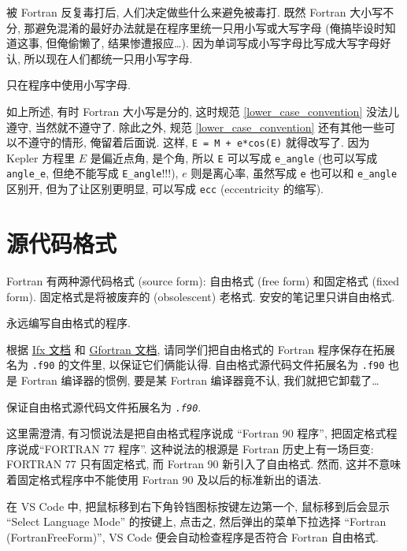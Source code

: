 被 Fortran 反复毒打后, 人们决定做些什么来避免被毒打. 既然 Fortran 大小写不分, 那避免混淆的最好办法就是在程序里统一只用小写或大写字母 (俺搞毕设时知道这事, 但俺偷懒了, 结果惨遭报应\dots{}). 因为单词写成小写字母比写成大写字母好认, 所以现在人们都统一只用小写字母.
\begin{convention}
    只在程序中使用小写字母.\label{lower_case_convention}
\end{convention}
如上所述, 有时 Fortran 大小写是分的, 这时规范 \ref{lower_case_convention} 没法儿遵守, 当然就不遵守了. 除此之外, 规范 \ref{lower_case_convention} 还有其他一些可以不遵守的情形, 俺留着后面说. 这样, \texttt{E = M + e*cos(E)} 就得改写了. 因为 Kepler 方程里 $E$ 是偏近点角, 是个角, 所以 \texttt{E} 可以写成 \texttt{e\_{}angle} (也可以写成 \texttt{angle\_{}e}, 但绝不能写成 \texttt{E\_{}angle}!!!), $e$ 则是离心率, 虽然写成 \texttt{e} 也可以和 \texttt{e\_{}angle} 区别开, 但为了让区别更明显, 可以写成 \texttt{ecc} (eccentricity 的缩写).

\section{源代码格式}

Fortran 有两种源代码格式 (source form): 自由格式 (free form) 和固定格式 (fixed form). 固定格式是将被废弃的 (obsolescent) 老格式. 安安的笔记里只讲自由格式.
\begin{convention}
    永远编写自由格式的程序.
\end{convention}

根据 \href{https://cdrdv2.intel.com/v1/dl/getContent/824360?fileName=fortran-compiler_developer-guide-reference_2024.2-767251-824360.pdf}{Ifx 文档} 和 \href{https://gcc.gnu.org/onlinedocs/gcc-13.2.0/gfortran.pdf}{Gfortran 文档}, 请同学们把自由格式的 Fortran 程序保存在拓展名为 \texttt{.f90} 的文件里, 以保证它们俩能认得. 自由格式源代码文件拓展名为 \texttt{.f90} 也是 Fortran 编译器的惯例, 要是某 Fortran 编译器竟不认, 我们就把它卸载了\dots{}
\begin{convention}
    保证自由格式源代码文件拓展名为 \texttt{\emph{.f90}}.
\end{convention}

这里需澄清, 有习惯说法是把自由格式程序说成 ``Fortran 90 程序'', 把固定格式程序说成``FORTRAN 77 程序''. 这种说法的根源是 Fortran 历史上有一场巨变: FORTRAN 77 只有固定格式, 而 Fortran 90 新引入了自由格式. 然而, 这并不意味着固定格式程序中不能使用 Fortran 90 及以后的标准新出的语法.

在 VS Code 中, 把鼠标移到右下角铃铛图标按键左边第一个, 鼠标移到后会显示 ``Select Language Mode'' 的按键上, 点击之, 然后弹出的菜单下拉选择 ``Fortran (FortranFreeForm)'', VS Code 便会自动检查程序是否符合 Fortran 自由格式.

